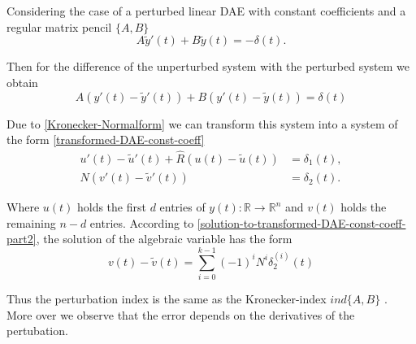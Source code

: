 Considering the case of a perturbed linear DAE with constant coefficients and a regular matrix pencil $\{A,B\}$
\begin{displaymath}
	A \tilde{y}'(t) + B \tilde{y}(t) = -\delta(t).
\end{displaymath}

Then for the difference of the unperturbed system with the perturbed system we obtain
\begin{displaymath}
	A(y'(t)-\tilde{y}'(t)) + B(y'(t)-\tilde{y}(t)) = \delta(t)
\end{displaymath}

Due to \ref{Kronecker-Normalform} we can transform this system into a system of the form \eqref{transformed-DAE-const-coeff} %
\begin{align*}
	u'(t) - \tilde{u}'(t) + \hat{R} (u(t) - \tilde{u}(t) ) &= \delta_1(t), \\
	N(v'(t) - \tilde{v}'(t)) &= \delta_2(t).
\end{align*}

Where $u(t)$ holds the first $d$ entries of $y(t):\mathbb{R} \to \mathbb{R}^n$ and $v(t)$ holds the remaining $n-d$ entries. According to \eqref{solution-to-transformed-DAE-const-coeff-part2}, the solution of the algebraic variable has the form
\begin{displaymath}
	v(t) - \tilde{v}(t) = \sum_{i=0}^{k-1} (-1)^iN^i \delta_2^{(i)}(t) 
\end{displaymath}

Thus the perturbation index is the same as the Kronecker-index $ind\{A,B\}$ \cite{NumerikGewöhnlicherDifferentialgleichungen}. More over we observe that the error depends on the derivatives of the pertubation.


	
	
	